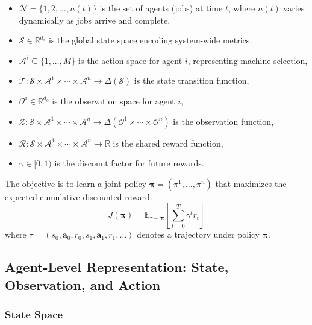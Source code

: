 \begin{itemize}
    \item \( \mathcal{N} = \{1, 2, \ldots, n(t)\} \) is the set of agents (jobs) at time \( t \), where \( n(t) \) varies dynamically as jobs arrive and complete,
    \item \( \mathcal{S} \in \mathbb{R}^{d_s} \) is the global state space encoding system-wide metrics,
    \item \( \mathcal{A}^i \subseteq \{1, \ldots, M\} \) is the action space for agent \( i \), representing machine selection,
    \item \( \mathcal{T}: \mathcal{S} \times \mathcal{A}^1 \times \cdots \times \mathcal{A}^n \rightarrow \Delta(\mathcal{S}) \) is the state transition function,
    \item \( \mathcal{O}^i \in \mathbb{R}^{d_o} \) is the observation space for agent \( i \),
    \item \( \mathcal{Z}: \mathcal{S} \times \mathcal{A}^1 \times \cdots \times \mathcal{A}^n \rightarrow \Delta(\mathcal{O}^1 \times \cdots \times \mathcal{O}^n) \) is the observation function,
    \item \( \mathcal{R}: \mathcal{S} \times \mathcal{A}^1 \times \cdots \times \mathcal{A}^n \rightarrow \mathbb{R} \) is the shared reward function,
    \item \( \gamma \in [0,1) \) is the discount factor for future rewards.
\end{itemize}

The objective is to learn a joint policy \( \boldsymbol{\pi} = (\pi^1, \ldots, \pi^n) \) that maximizes the expected cumulative discounted reward:
\[
J(\boldsymbol{\pi}) = \mathbb{E}_{\tau \sim \boldsymbol{\pi}} \left[ \sum_{t=0}^{T} \gamma^t r_t \right]
\]
where \( \tau = (s_0, \mathbf{a}_0, r_0, s_1, \mathbf{a}_1, r_1, \ldots) \) denotes a trajectory under policy \( \boldsymbol{\pi} \).


\subsection{Agent-Level Representation: State, Observation, and Action}

\subsubsection{State Space}

